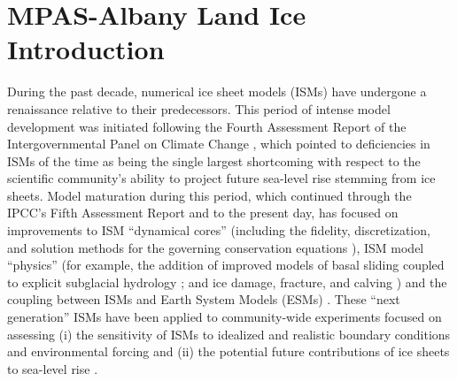 \chapter{MPAS-Albany Land Ice Introduction}
\label{chap:landice-intro}

During the past decade, numerical ice sheet models (ISMs) have undergone a renaissance relative to their predecessors. This period of intense model development was initiated following the Fourth Assessment Report of the Intergovernmental Panel on Climate Change \citep{IPCCWG1PhysicalSolomon2007}, which pointed to deficiencies in ISMs of the time as being the single largest shortcoming with respect to the scientific community's ability to project future sea-level rise stemming from ice sheets. 
Model maturation during this period, which continued through the IPCC's Fifth Assessment Report \citep{IPCCWG1PhysicalStocker2013} and to the present day, has focused on improvements to ISM ``dynamical cores'' (including the fidelity, discretization, and solution methods for the governing conservation equations \citep[e.g.,][]{Bueler2009,Schoof2010,Goldberg2011a,perego2012,Leng2012,Larour2012,Aschwanden2012,Cornford2013,gagliardini2013,brinkerhoff2013}), ISM model ``physics'' (for example, the addition of improved models of basal sliding coupled to explicit subglacial hydrology \citep[e.g.,][]{Schoof2005,Werder2013,Hewitt2013,Hoffman2014,Bueler2015}; and ice damage, fracture, and calving \citep[e.g.,][]{Astrom2014,Bassis2015,Borstad2016,Jimenez2017}) and the coupling between ISMs and Earth System Models (ESMs) \citep[e.g.,][]{Ridley2005,vizcaino2008,Vizcaino2009,Fyke2011,Lipscomb2013}. These ``next generation'' ISMs have been applied to community-wide experiments focused on assessing (i) the sensitivity of ISMs to idealized and realistic boundary conditions and environmental forcing and (ii) the potential future contributions of ice sheets to sea-level rise \citep[see e.g.,][]{pattyn2013,Nowicki2013a,Nowicki2013b,Bindschadler2013,Shannon2013,edwards2014}. 

